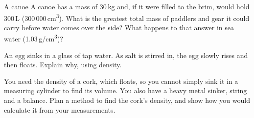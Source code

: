 \begin{wedo}{A canoe}
A canoe has a mass of 30\,kg and, if it were filled to the brim, would hold 300\,L (300\,000\,cm\textsuperscript{3}). What is the greatest total mass of paddlers and gear it could carry before water comes over the side? What happens to that answer in sea water (1.03\,g/cm\textsuperscript{3})?
\workbox{5.5cm}
\end{wedo}

\label{prac:6}


\task An egg sinks in a glass of tap water. As salt is stirred in, the egg slowly rises and then floats. Explain why, using density.
\answerbox{4.5cm}

\label{ext:6}

\task You need the density of a cork, which floats, so you cannot simply sink it in a measuring cylinder to find its volume. You also have a heavy metal sinker, string and a balance. Plan a method to find the cork's density, and show how you would calculate it from your measurements.
\answerbox{9cm}

\clearpage
